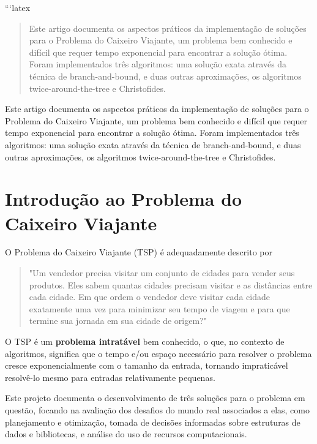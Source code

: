 ```latex
 

\maketitle

\begin{abstract}
  Este artigo documenta os aspectos práticos da implementação de soluções
  para o Problema do Caixeiro Viajante, um problema bem conhecido e difícil que requer
  tempo exponencial para encontrar a solução ótima. Foram implementados três algoritmos:
  uma solução exata através da técnica de branch-and-bound, e duas outras aproximações,
  os algoritmos twice-around-the-tree e Christofides.
\end{abstract}
     
\begin{resumo} 
  Este artigo documenta os aspectos práticos da implementação de soluções
  para o Problema do Caixeiro Viajante, um problema bem conhecido e difícil que requer
  tempo exponencial para encontrar a solução ótima. Foram implementados três algoritmos:
  uma solução exata através da técnica de branch-and-bound, e duas outras aproximações,
  os algoritmos twice-around-the-tree e Christofides.
\end{resumo}


\section{Introdução ao Problema do Caixeiro Viajante} \label{sec:intro}

O Problema do Caixeiro Viajante (TSP) é adequadamente descrito por \cite{brilliant_explanation} 

\begin{quote}
  "Um vendedor precisa visitar um conjunto de cidades para vender seus produtos. Eles sabem quantas 
  cidades precisam visitar e as distâncias entre cada cidade. Em que ordem 
  o vendedor deve visitar cada cidade exatamente uma vez para minimizar seu 
  tempo de viagem e para que termine sua jornada em sua cidade de origem?"
\end{quote}

O TSP é um \textbf{problema intratável} bem conhecido, o que, no contexto de 
algoritmos, significa que o tempo e/ou espaço necessário para resolver o problema cresce 
exponencialmente com o tamanho da entrada, tornando impraticável resolvê-lo mesmo para 
entradas relativamente pequenas.

Este projeto documenta o desenvolvimento de três soluções para o problema em questão, 
focando na avaliação dos desafios do mundo real associados a elas, como planejamento e 
otimização, tomada de decisões informadas sobre estruturas de dados e bibliotecas, e 
análise do uso de recursos computacionais.

